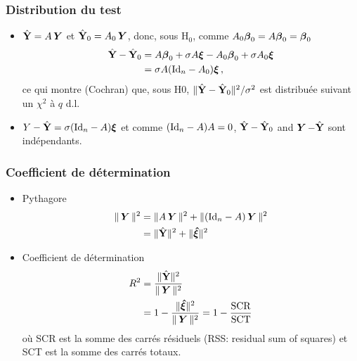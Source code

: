 \begin{frame}
\frametitle{Distribution du test}
\begin{itemize}
  \item $\hat{\mathbf{Y}} = A \operatorname{\boldsymbol{Y}}$ et $\hat{\mathbf{Y}}_0= A_0 \operatorname{\boldsymbol{Y}}$, donc, sous $\mathrm{H}_0$, comme $A_0 \boldsymbol{\beta}_0= A \boldsymbol{\beta}_0= \boldsymbol{\beta}_0$
\begin{align*}
\hat{\mathbf{Y}} - \hat{\mathbf{Y}}_0&= A \boldsymbol{\beta}_0 + \sigma A \boldsymbol{\xi} - A_0 \boldsymbol{\beta}_0 + \sigma A_0 \boldsymbol{\xi} \\
&=\sigma A (\mathrm{Id}_{n} - A_0) \boldsymbol{\xi} \,,
\end{align*}
ce qui montre (Cochran) que, sous H0, $\| \hat{\mathbf{Y}} - \hat{\mathbf{Y}}_0 \|^2/ \sigma^2$ est distribuée suivant un $\chi^2$ à $q$ d.l. 
  \item $Y - \hat{\mathbf{Y}}= \sigma (\mathrm{Id}_{n} - A) \boldsymbol{\xi}$ et comme $(\mathrm{Id}_{n} - A) A =0$, $\hat{\mathbf{Y}}- \hat{\mathbf{Y}}_0$ and $\operatorname{\boldsymbol{Y}} - \hat{\mathbf{Y}}$ sont indépendants.
\end{itemize}
\end{frame}

\begin{frame}
\frametitle{Coefficient de détermination}
\begin{itemize}
\item \alert{Pythagore}
\begin{align*}
\| \operatorname{\boldsymbol{Y}} \|^2 &= \| A \operatorname{\boldsymbol{Y}} \|^2 + \| (\mathrm{Id}_{n} - A) \operatorname{\boldsymbol{Y}} \|^2 \\
            &= \| \hat{\mathbf{Y}} \|^2 + \| \boldsymbol{\hat{\xi}} \|^2
\end{align*}
\item \alert{Coefficient de détermination}
\begin{align*}
R^2 &= \frac{\|\hat{\mathbf{Y}}\|^2}{\|\operatorname{\boldsymbol{Y}}\|^2} \\
    &= 1 - \frac{\| \boldsymbol{\hat{\xi}} \|^2}{\|\operatorname{\boldsymbol{Y}}\|^2} = 1 - \frac{\mathrm{SCR}}{\mathrm{SCT}}
\end{align*}
où \alert{SCR} est la somme des carrés résiduels (RSS: residual sum of squares) et \alert{SCT} est la somme des carrés totaux.
\end{itemize}
\end{frame}

